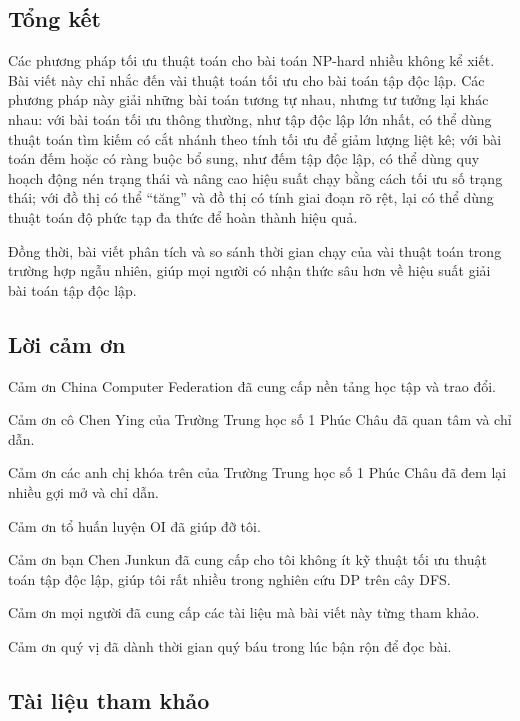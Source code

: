 \documentclass[11pt]{article}
\begin{document}
\subsection{Tổng kết}

Các phương pháp tối ưu thuật toán cho bài toán NP-hard nhiều không kể xiết. Bài
viết này chỉ nhắc đến vài thuật toán tối ưu cho bài toán tập độc lập. Các
phương pháp này giải những bài toán tương tự nhau, nhưng tư tưởng lại khác
nhau: với bài toán tối ưu thông thường, như tập độc lập lớn nhất, có thể dùng
thuật toán tìm kiếm có cắt nhánh theo tính tối ưu để giảm lượng liệt kê; với
bài toán đếm hoặc có ràng buộc bổ sung, như đếm tập độc lập, có thể dùng quy
hoạch động nén trạng thái và nâng cao hiệu suất chạy bằng cách tối ưu số trạng
thái; với đồ thị có thể ``tăng'' và đồ thị có tính giai đoạn rõ rệt, lại có
thể dùng thuật toán độ phức tạp đa thức để hoàn thành hiệu quả.

Đồng thời, bài viết phân tích và so sánh thời gian chạy của vài thuật toán
trong trường hợp ngẫu nhiên, giúp mọi người có nhận thức sâu hơn về hiệu suất
giải bài toán tập độc lập.

\subsection*{Lời cảm ơn}

Cảm ơn China Computer Federation đã cung cấp nền tảng học tập và trao đổi.

Cảm ơn cô Chen Ying của Trường Trung học số 1 Phúc Châu đã quan tâm và chỉ
dẫn.

Cảm ơn các anh chị khóa trên của Trường Trung học số 1 Phúc Châu đã đem lại
nhiều gợi mở và chỉ dẫn.

Cảm ơn tổ huấn luyện OI đã giúp đỡ tôi.

Cảm ơn bạn Chen Junkun đã cung cấp cho tôi không ít kỹ thuật tối ưu thuật toán
tập độc lập, giúp tôi rất nhiều trong nghiên cứu DP trên cây DFS.

Cảm ơn mọi người đã cung cấp các tài liệu mà bài viết này từng tham khảo.

Cảm ơn quý vị đã dành thời gian quý báu trong lúc bận rộn để đọc bài.

\subsection*{Tài liệu tham khảo}
\end{document}
